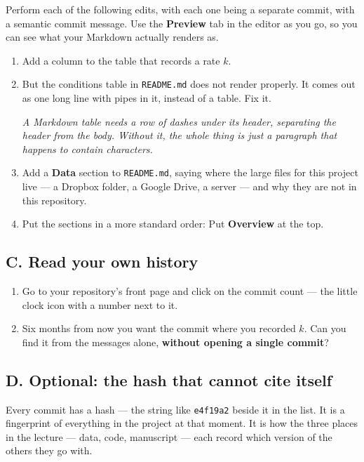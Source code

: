 \documentclass[
  letterpaper,
  DIV=11,
  numbers=noendperiod]{scrartcl}
\begin{document}
Perform each of the following edits, with each one being a separate
commit, with a semantic commit message. Use the \textbf{Preview} tab in
the editor as you go, so you can see what your Markdown actually renders
as.

\begin{enumerate}
\def\labelenumi{\roman{enumi}.}
\item
  Add a column to the table that records a rate \(k\).
\item
  But the conditions table in \texttt{README.md} does not render
  properly. It comes out as one long line with pipes in it, instead of a
  table. Fix it.

  \emph{A Markdown table needs a row of dashes under its header,
  separating the header from the body. Without it, the whole thing is
  just a paragraph that happens to contain \texttt{\textbar{}}
  characters.}
\item
  Add a \textbf{Data} section to \texttt{README.md}, saying where the
  large files for this project live --- a Dropbox folder, a Google
  Drive, a server --- and why they are not in this repository.
\item
  Put the sections in a more standard order: Put \textbf{Overview} at
  the top.
\end{enumerate}

\subsection{C. Read your own history}\label{c.-read-your-own-history}

\begin{enumerate}
\def\labelenumi{\roman{enumi}.}
\item
  Go to your repository's front page and click on the commit count ---
  the little clock icon with a number next to it.
\item
  Six months from now you want the commit where you recorded \(k\). Can
  you find it from the messages alone, \textbf{without opening a single
  commit}?
\end{enumerate}

\subsection{D. Optional: the hash that cannot cite
itself}\label{d.-optional-the-hash-that-cannot-cite-itself}

Every commit has a hash --- the string like \texttt{e4f19a2} beside it
in the list. It is a fingerprint of everything in the project at that
moment. It is how the three places in the lecture --- data, code,
manuscript --- each record which version of the others they go with.
\end{document}
